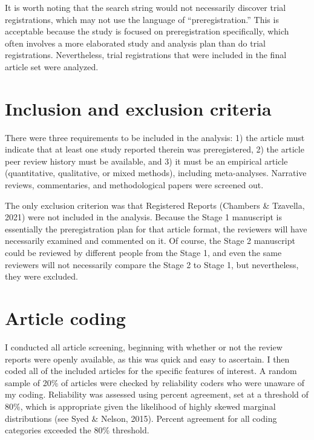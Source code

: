 \documentclass[authordate, empirical]{jote-new-article}
\begin{document}
	It is worth noting that the search string would not necessarily discover trial registrations, which may not use the language of “preregistration.” This is acceptable because the study is focused on preregistration specifically, which often involves a more elaborated study and analysis plan than do trial registrations. Nevertheless, trial registrations that were included in the final article set were analyzed.



	\section{\textbf{Inclusion and exclusion criteria}}



	There were three requirements to be included in the analysis: 1) the article must indicate that at least one study reported therein was preregistered, 2) the article peer review history must be available, and 3) it must be an empirical article (quantitative, qualitative, or mixed methods), including meta-analyses. Narrative reviews, commentaries, and methodological papers were screened out.



	The only exclusion criterion was that Registered Reports (Chambers \& Tzavella, 2021) were not included in the analysis. Because the Stage 1 manuscript is essentially the preregistration plan for that article format, the reviewers will have necessarily examined and commented on it. Of course, the Stage 2 manuscript could be reviewed by different people from the Stage 1, and even the same reviewers will not necessarily compare the Stage 2 to Stage 1, but nevertheless, they were excluded.



	\section{\textbf{Article coding}}



	I conducted all article screening, beginning with whether or not the review reports were openly available, as this was quick and easy to ascertain. I then coded all of the included articles for the specific features of interest. A random sample of 20\% of articles were checked by reliability coders who were unaware of my coding. Reliability was assessed using percent agreement, set at a threshold of 80\%, which is appropriate given the likelihood of highly skewed marginal distributions (see Syed \& Nelson, 2015). Percent agreement for all coding categories exceeded the 80\% threshold.
\end{document}
